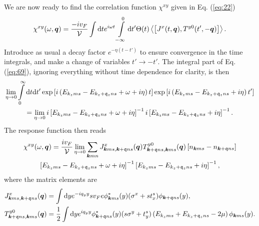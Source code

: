 We are now ready to find the correlation function $\chi ^{xy}$ given in Eq. (\ref{eq:22})
\begin{equation}
  \label{eq:69}
  \chi ^{xy}(\omega, \vec{q}) =
  \frac{-i v_F}{\mathcal{V}  }
  \int \mathrm{d}t e^{i \omega t} \int\limits_{-\infty }^0 \mathrm{d}t'
  \Theta (t)
  \Braket{\left[
J^x(t, \vec{q}), T^{y 0}(t', -\vec{q})
    \right]}.
\end{equation}
Introduce as usual a decay factor $e^{-\eta (t-t')}$ to ensure convergence in the time integrals, and make a change of variables $t' \to -t'	$.
The integral part of Eq. (\ref{eq:69}), ignoring everything without time dependence for clarity, is then
\begin{multline}
  \lim_{\eta \to 0}
  \int\limits_{0}^{\infty } \mathrm{d}t \mathrm{d}t'
    \exp \left[ i \left(
        E_{k_z m s} - E_{k_z+\mathfrak{q}_z ns} + \omega   + i \eta
      \right) t \right]
    \exp \left[ i \left(
        E_{k_z m s} - E_{k_z+\mathfrak{q}_z ns} + i \eta
      \right) t' \right]\\
  =
  \lim_{\eta \to 0} i \left[ E_{k_zms} - E_{k_z+\mathfrak{q}_z ns} + \omega   + i\eta   \right]^{-1}
i \left[ E_{k_zms} - E_{k_z+\mathfrak{q}_z ns} + i \eta   \right]^{-1}.
\end{multline}
The response function then reads
\begin{multline}
  \chi ^{xy}(\omega , \bm{q}) =
  \frac{i v_F  }{\mathcal{V} }
  \lim_{\eta \to 0}
  \sum\limits_{\bm{k}mn}^{}
  J^x_{\bm{k}ms, \bm{k}+\mathfrak{q}ns}(\bm{q})
  T^{y 0}_{\bm{k}+\mathfrak{q}ns, \bm{k}ms}(\bm{q})
  \left[ n_{\bm{k}ms}- n_{\bm{k}+\mathfrak{q} ns} \right] \\
  \left[ E_{k_zms} - E_{k_z+\mathfrak{q}_z ns} + \omega   + i\eta   \right]^{-1}
  \left[ E_{k_zms} - E_{k_z+\mathfrak{q}_z ns} + i \eta   \right]^{-1},
\end{multline}
where the matrix elements are
\begin{align}\label{eq:70}
  J^x_{\bm{k}ms, \bm{k}+\mathfrak{q}ns}(\bm{q}) &= \int \mathrm{d}y
                                                e^{-i q_y y}
                                                 s v_F e\phi ^{*}_{\bm{k}m s}(y)
                                                 (\sigma^x + s t^s_x)
                                                \phi _{\bm{k}+\mathfrak{q}n s}(y),\\
\label{eq:9} T^{y 0}_{\bm{k}+\mathfrak{q} n s, \bm{k} m s}(\bm{q}) &= \frac{1}{2}
              \int \mathrm{d}y
              e^{iq_y y}
              \phi ^{*}_{\bm{k}+\mathfrak{q} n s}(y)
              (s\sigma^y + t^s_y )
              \left(
              E_{k_zm s} + E_{k_z+\mathfrak{q}_z n s} - 2 \mu
              \right)
              \phi _{\bm{k} m s}(y).
\end{align}

